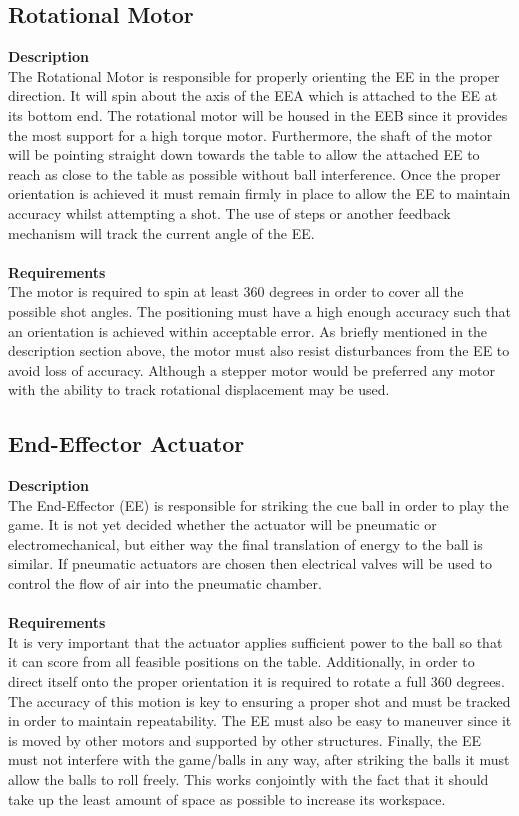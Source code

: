 \documentclass[titlepage]{article}
\begin{document}
\subsection{Rotational Motor}
\textbf{Description}\\
The Rotational Motor is responsible for properly orienting the EE in the proper direction. It will spin about the axis of the EEA which is attached to the EE at its bottom end. The rotational motor will be housed in the EEB since it provides the most support for a high torque motor. Furthermore, the shaft of the motor will be pointing straight down towards the table to allow the attached EE to reach as close to the table as possible without ball interference. Once the proper orientation is achieved it must remain firmly in place to allow the EE to maintain accuracy whilst attempting a shot. The use of steps or another feedback mechanism will track the current angle of the EE.\\~\\
\textbf{Requirements}\\
The motor is required to spin at least 360 degrees in order to cover all the possible shot angles. The positioning must have a high enough accuracy such that an orientation is achieved within acceptable error. As briefly mentioned in the description section above, the motor must also resist disturbances from the EE to avoid loss of accuracy. Although a stepper motor would be preferred any motor with the ability to track rotational displacement may be used.

\subsection{End-Effector Actuator}
\textbf{Description}\\
The End-Effector (EE) is responsible for striking the cue ball in order to play the game. It is not yet decided whether the actuator will be pneumatic or electromechanical, but either way the final translation of energy to the ball is similar. If pneumatic actuators are chosen then electrical valves will be used to control the flow of air into the pneumatic chamber.\\~\\
\textbf{Requirements}\\
It is very important that the actuator applies sufficient power to the ball so that it can score from all feasible positions on the table. Additionally, in order to direct itself onto the proper orientation it is required to rotate a full 360 degrees. The accuracy of this motion is key to ensuring a proper shot and must be tracked in order to maintain repeatability. The EE must also be easy to maneuver since it is moved by other motors and supported by other structures. Finally, the EE must not interfere with the game/balls in any way, after striking the balls it must allow the balls to roll freely. This works conjointly with the fact that it should take up the least amount of space as possible to increase its workspace.
\end{document}
